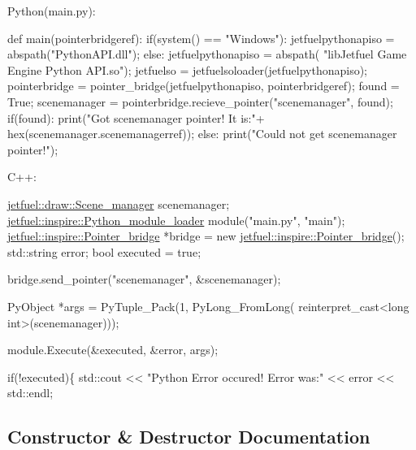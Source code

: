 Python(main.\+py)\+:


\begin{DoxyCode}
def main(pointerbridgeref):
    if(system() == \textcolor{stringliteral}{"Windows"}):
        jetfuelpythonapiso = abspath(\textcolor{stringliteral}{"PythonAPI.dll"});
    \textcolor{keywordflow}{else}:
        jetfuelpythonapiso = abspath(
            \textcolor{stringliteral}{"libJetfuel Game Engine Python API.so"});
    jetfuelso = jetfuelsoloader(jetfuelpythonapiso);
    pointerbridge = pointer\_bridge(jetfuelpythonapiso, 
                                    pointerbridgeref);
    found = True;
    scenemanager = pointerbridge.recieve\_pointer(\textcolor{stringliteral}{"scenemanager"}, 
                                                 found);
    \textcolor{keywordflow}{if}(found):
        print(\textcolor{stringliteral}{"Got scenemanager pointer! It is:"}+
              hex(scenemanager.scenemanagerref));
    \textcolor{keywordflow}{else}:
        print(\textcolor{stringliteral}{"Could not get scenemanager pointer!"});
\end{DoxyCode}


C++\+: 
\begin{DoxyCode}
 \hyperlink{classjetfuel_1_1draw_1_1Scene__manager}{jetfuel::draw::Scene\_manager} scenemanager;
 \hyperlink{classjetfuel_1_1inspire_1_1Python__module__loader}{jetfuel::inspire::Python\_module\_loader} module(\textcolor{stringliteral}{"main.py"}, \textcolor{stringliteral}{"main"});
 \hyperlink{classjetfuel_1_1inspire_1_1Pointer__bridge}{jetfuel::inspire::Pointer\_bridge} *bridge = \textcolor{keyword}{new} 
                               \hyperlink{classjetfuel_1_1inspire_1_1Pointer__bridge}{jetfuel::inspire::Pointer\_bridge}();
 std::string error;
 \textcolor{keywordtype}{bool} executed = \textcolor{keyword}{true};

 bridge.send\_pointer(\textcolor{stringliteral}{"scenemanager"}, &scenemanager);

 PyObject *args = PyTuple\_Pack(1, PyLong\_FromLong(
                       reinterpret\_cast<long int>(scenemanager)));

 module.Execute(&executed, &error, args);

\textcolor{keywordflow}{if}(!executed)\{
   std::cout << \textcolor{stringliteral}{"Python Error occured! Error was:"} << error << 
   std::endl;
\end{DoxyCode}
 

\subsection{Constructor \& Destructor Documentation}
\mbox{\label{classjetfuel_1_1inspire_1_1Pointer__bridge_a8b799f891596d70d98ee577ef87a6781}} 
